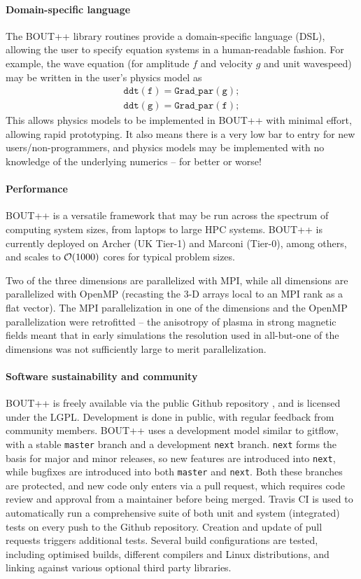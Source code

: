 \paragraph{Domain-specific language}
The BOUT++ library routines provide a domain-specific language (DSL), allowing the user to specify equation systems in a human-readable fashion.
For example, the wave equation (for amplitude $f$ and velocity $g$ and unit wavespeed) may be written in the user's physics model as
\begin{align*}
  \mathtt{ddt(f) = Grad\_par(g);}\\
  \mathtt{ddt(g) = Grad\_par(f);}
\end{align*}
This allows physics models to be implemented in BOUT++ with minimal effort, allowing rapid prototyping.
It also means there is a very low bar to entry for new users/non-programmers, and physics models may be implemented with no knowledge of the underlying numerics -- for better or worse!

\paragraph{Performance}
BOUT++ is a versatile framework that may be run across the spectrum of computing system sizes, from laptops to large HPC systems.
BOUT++ is currently deployed on Archer (UK Tier-1) and Marconi (Tier-0), among others, and scales to ${\cal O}(1000)$ cores for typical problem sizes.

Two of the three dimensions are parallelized with MPI, while all dimensions are parallelized with OpenMP (recasting the 3-D arrays local to an MPI rank as a flat vector).
The MPI parallelization in one of the dimensions and the OpenMP parallelization were retrofitted -- the anisotropy of plasma in strong magnetic fields meant that in early simulations the resolution used in all-but-one of the dimensions was not sufficiently large to merit parallelization.

\paragraph{Software sustainability and community}
BOUT++ is freely available via the public Github repository \cite{boutrepo}, and is licensed under the LGPL. Development is done in public, with regular feedback from community members.
%
BOUT++ uses a development model similar to gitflow, with a stable \texttt{master} branch and a development \texttt{next} branch. \texttt{next} forms the basis for major and minor releases, so new features are introduced into \texttt{next}, while bugfixes are introduced into both \texttt{master} and \texttt{next}.
Both these branches are protected, and new code only enters via a pull request, which requires code review and approval from a maintainer before being merged.
Travis CI is used to automatically run a comprehensive suite of both unit and system (integrated) tests on every push to the Github repository. Creation and update of pull requests triggers additional tests. Several build configurations are tested, including optimised builds, different compilers and Linux distributions, and linking against various optional third party libraries.

